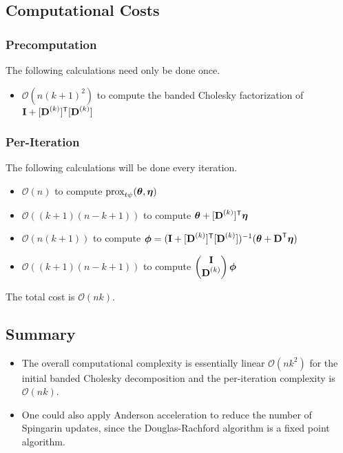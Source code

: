 \documentclass{article}
\newcommand{\Tra}{^{\sf T}} %
\newcommand{\Inv}{^{-1}} %
\newcommand{\V}[1]{{\bm{\mathbf{\MakeLowercase{#1}}}}} %
\newcommand{\M}[1]{{\bm{\mathbf{\MakeUppercase{#1}}}}} %
\newcommand{\Mn}[2]{\M{#1}^{(#2)}} %
\newcommand{\prox}[2]{\operatorname{prox}_{#1}({#2})}
\begin{document}
\subsection*{Computational Costs}

\subsubsection*{Precomputation}

The following calculations need only be done once. 

\begin{itemize}
\item $\mathcal{O}(n(k + 1)^2)$ to compute the banded Cholesky factorization of $\M{I} + [\Mn{D}{k}]\Tra[\Mn{D}{k}]$
\end{itemize}

\subsubsection*{Per-Iteration}

The following calculations will be done every iteration.

\begin{itemize}
\item $\mathcal{O}(n)$ to compute $\prox{t\psi}{\V{\theta}, \V{\eta}}$
\item $\mathcal{O}((k+1)(n-k+1))$ to compute $\V{\theta} + [\Mn{D}{k}]\Tra\V{\eta}$
\item $\mathcal{O}(n(k+1))$ to compute $\V{\phi} = (\M{I} +[\Mn{D}{k}]\Tra[\Mn{D}{k}] )\Inv(\V{\theta} + \M{D}\Tra\V{\eta})$
\item $\mathcal{O}((k+1)(n-k+1))$ to compute $\begin{pmatrix}
\M{I} \\ \Mn{D}{k} \end{pmatrix}\V{\phi}$
\end{itemize}

The total cost is $\mathcal{O}(nk)$.

\subsection{Summary}

\begin{itemize}
\item The overall computational complexity is essentially linear $\mathcal{O}(nk^2)$ for the initial banded Cholesky decomposition and the per-iteration complexity is $\mathcal{O}(nk)$.
\item One could also apply Anderson acceleration to reduce the number of Spingarin updates, since the Douglas-Rachford algorithm is a fixed point algorithm.
\end{itemize}




\end{document}
